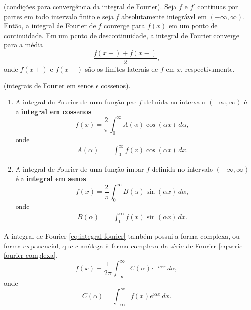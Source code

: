 \documentclass{article}
\begin{document}
\begin{thm} (condições para convergência da integral de Fourier).
    Seja \(f\) e \(f'\) contínuas por partes em todo intervalo finito e seja \(f\) absolutamente integrável em \((-\infty, \infty)\). Então, a integral de Fourier de \(f\) converge para \(f(x)\) em um ponto de continuidade. Em um ponto de descontinuidade, a integral de Fourier converge para a média
    \begin{equation}
        \frac{f(x+) + f(x-)}{2},
    \end{equation}
    \noindent onde \(f(x+)\) e \(f(x-)\) são os limites laterais de \(f\) em \(x\), respectivamente.
\end{thm}

\begin{defn} (integrais de Fourier em senos e cossenos).
    \begin{enumerate}
        \item[(i)] A integral de Fourier de uma função par \(f\) definida no intervalo \(\left(-\infty, \infty\right)\) é a \textbf{integral em cossenos}
        \begin{equation}
            f(x) = \frac{2}{\pi} \int_{0}^{\infty} A(\alpha) \cos(\alpha x) \, d\alpha,
        \end{equation}
        \noindent onde
        \begin{align}
            A(\alpha) &= \int_{0}^{\infty} f(x) \cos(\alpha x) \, dx.
        \end{align}
        \item[(ii)] A integral de Fourier de uma função ímpar \(f\) definida no intervalo \(\left(-\infty, \infty\right)\) é a \textbf{integral em senos}
        \begin{equation}
            f(x) = \frac{2}{\pi} \int_{0}^{\infty} B(\alpha) \sin(\alpha x) \, d\alpha,
        \end{equation}
        \noindent onde
        \begin{align}
            B(\alpha) &= \int_{0}^{\infty} f(x) \sin(\alpha x) \, dx.
        \end{align}
    \end{enumerate}
\end{defn}

\begin{rem}
    A integral de Fourier \eqref{eq:integral-fourier} também possui a forma complexa, ou forma exponencial, que é análoga à forma complexa da série de Fourier \eqref{eq:serie-fourier-complexa}.
    \begin{equation}\label{eq:integral-fourier-complexa}
        f(x) = \frac{1}{2\pi} \int_{-\infty}^{\infty} C(\alpha) e^{-i\alpha x} \, d\alpha,
    \end{equation}
    \noindent onde
    \begin{equation}
        C(\alpha) = \int_{-\infty}^{\infty} f(x) e^{i\alpha x} \, dx.
    \end{equation}
\end{rem}
\end{document}
